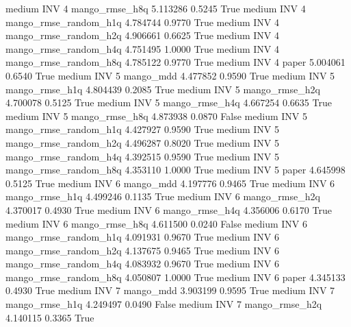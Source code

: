     medium      INV                 4        mango_rmse_h8q   5.113286      0.5245    True
    medium      INV                 4 mango_rmse_random_h1q   4.784744      0.9770    True
    medium      INV                 4 mango_rmse_random_h2q   4.906661      0.6625    True
    medium      INV                 4 mango_rmse_random_h4q   4.751495      1.0000    True
    medium      INV                 4 mango_rmse_random_h8q   4.785122      0.9770    True
    medium      INV                 4                 paper   5.004061      0.6540    True
    medium      INV                 5             mango_mdd   4.477852      0.9590    True
    medium      INV                 5        mango_rmse_h1q   4.804439      0.2085    True
    medium      INV                 5        mango_rmse_h2q   4.700078      0.5125    True
    medium      INV                 5        mango_rmse_h4q   4.667254      0.6635    True
    medium      INV                 5        mango_rmse_h8q   4.873938      0.0870   False
    medium      INV                 5 mango_rmse_random_h1q   4.427927      0.9590    True
    medium      INV                 5 mango_rmse_random_h2q   4.496287      0.8020    True
    medium      INV                 5 mango_rmse_random_h4q   4.392515      0.9590    True
    medium      INV                 5 mango_rmse_random_h8q   4.353110      1.0000    True
    medium      INV                 5                 paper   4.645998      0.5125    True
    medium      INV                 6             mango_mdd   4.197776      0.9465    True
    medium      INV                 6        mango_rmse_h1q   4.499246      0.1135    True
    medium      INV                 6        mango_rmse_h2q   4.370017      0.4930    True
    medium      INV                 6        mango_rmse_h4q   4.356006      0.6170    True
    medium      INV                 6        mango_rmse_h8q   4.611500      0.0240   False
    medium      INV                 6 mango_rmse_random_h1q   4.091931      0.9670    True
    medium      INV                 6 mango_rmse_random_h2q   4.137675      0.9465    True
    medium      INV                 6 mango_rmse_random_h4q   4.083932      0.9670    True
    medium      INV                 6 mango_rmse_random_h8q   4.050807      1.0000    True
    medium      INV                 6                 paper   4.345133      0.4930    True
    medium      INV                 7             mango_mdd   3.903199      0.9595    True
    medium      INV                 7        mango_rmse_h1q   4.249497      0.0490   False
    medium      INV                 7        mango_rmse_h2q   4.140115      0.3365    True
